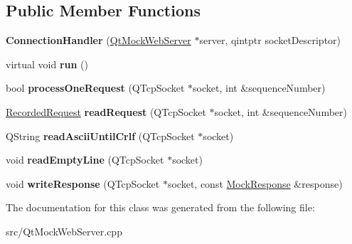 \subsection*{Public Member Functions}
\begin{DoxyCompactItemize}
\item 
\hypertarget{class_connection_handler_a43569267e3aebe46c87cb5720964408e}{{\bfseries Connection\+Handler} (\hyperlink{class_qt_mock_web_server}{Qt\+Mock\+Web\+Server} $\ast$server, qintptr socket\+Descriptor)}\label{class_connection_handler_a43569267e3aebe46c87cb5720964408e}

\item 
\hypertarget{class_connection_handler_ac391c617db066e72792bb558972f694e}{virtual void {\bfseries run} ()}\label{class_connection_handler_ac391c617db066e72792bb558972f694e}

\item 
\hypertarget{class_connection_handler_a698d857b8715bebe0d558734199d2ebc}{bool {\bfseries process\+One\+Request} (Q\+Tcp\+Socket $\ast$socket, int \&sequence\+Number)}\label{class_connection_handler_a698d857b8715bebe0d558734199d2ebc}

\item 
\hypertarget{class_connection_handler_a69da285f427abf30140723bc2d08924d}{\hyperlink{class_recorded_request}{Recorded\+Request} {\bfseries read\+Request} (Q\+Tcp\+Socket $\ast$socket, int \&sequence\+Number)}\label{class_connection_handler_a69da285f427abf30140723bc2d08924d}

\item 
\hypertarget{class_connection_handler_a3aa7b47d0093a1b0cb913b6d6d3a8563}{Q\+String {\bfseries read\+Ascii\+Until\+Crlf} (Q\+Tcp\+Socket $\ast$socket)}\label{class_connection_handler_a3aa7b47d0093a1b0cb913b6d6d3a8563}

\item 
\hypertarget{class_connection_handler_aea5e4983ee6d8224802c6fcb9ffcaf4e}{void {\bfseries read\+Empty\+Line} (Q\+Tcp\+Socket $\ast$socket)}\label{class_connection_handler_aea5e4983ee6d8224802c6fcb9ffcaf4e}

\item 
\hypertarget{class_connection_handler_a5ad060d15499c628f8420609d590c782}{void {\bfseries write\+Response} (Q\+Tcp\+Socket $\ast$socket, const \hyperlink{class_mock_response}{Mock\+Response} \&response)}\label{class_connection_handler_a5ad060d15499c628f8420609d590c782}

\end{DoxyCompactItemize}


The documentation for this class was generated from the following file\+:\begin{DoxyCompactItemize}
\item 
src/Qt\+Mock\+Web\+Server.\+cpp\end{DoxyCompactItemize}
